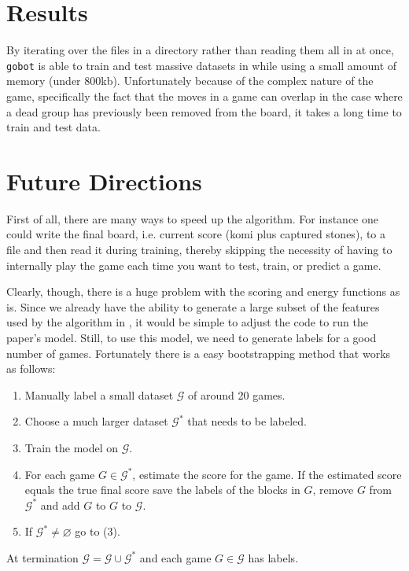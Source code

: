 \documentclass[11pt,letterpaper]{article}
\begin{document}
\section{Results}

By iterating over the files in a directory rather than reading them all in at once, {\tt gobot} is able to train and test
massive datasets in while using a small amount of memory (under 800kb). Unfortunately because of the complex
nature of the game, specifically the fact that the moves in a game can overlap in the case where a dead group has
previously been removed from the board, it takes a long time to train and test data.

\section{Future Directions}

First of all, there are many ways to speed up the algorithm. For instance one could write the final board, i.e. current
score (komi plus captured stones), to a file and then read it during training, thereby skipping the necessity of having
to internally play the game each time you want to test, train, or predict a game.

Clearly, though, there is a huge problem with the scoring and energy functions as is. Since we already have the
ability to generate a large subset of the features used by the algorithm in \cite{WHU:04}, it would be simple to adjust
the code to run the paper's model. Still, to use this model, we need to generate labels for a good number of games.
Fortunately there is a easy bootstrapping method that works as follows:
\begin{enumerate}
  \item Manually label a small dataset $\mathcal{ G }$ of around 20 games.
  \item Choose a much larger dataset $\mathcal{ G }^*$ that needs to be labeled.
  \item Train the model on $\mathcal{ G }$.
  \item For each game $G \in \mathcal{ G }^*$, estimate the score for the game. If the estimated score equals the
    true final score save the labels of the blocks in $G$, remove $G$ from $\mathcal{ G }^*$ and add $G$ to
    $G$ to $\mathcal{ G }$.
  \item If $\mathcal{ G }^* \neq \varnothing$ go to (3).
\end{enumerate}
At termination $\mathcal{ G } = \mathcal{ G } \cup \mathcal{ G }^*$ and each game $G \in \mathcal{ G }$ has labels.
\end{document}
